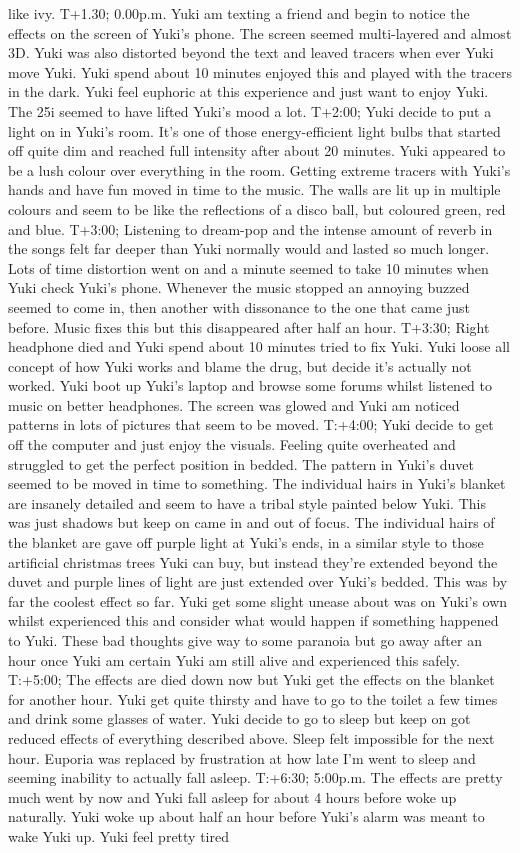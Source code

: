 \documentclass[12pt]{book}
\begin{document}
like ivy. T+1.30; 0.00p.m. Yuki am texting a friend and begin to notice the effects on the screen of Yuki's phone. The screen seemed multi-layered and almost 3D. Yuki was also distorted beyond the text and leaved tracers when ever Yuki move Yuki. Yuki spend about 10 minutes enjoyed this and played with the tracers in the dark. Yuki feel euphoric at this experience and just want to enjoy Yuki. The 25i seemed to have lifted Yuki's mood a lot. T+2:00; Yuki decide to put a light on in Yuki's room. It's one of those energy-efficient light bulbs that started off quite dim and reached full intensity after about 20 minutes. Yuki appeared to be a lush colour over everything in the room. Getting extreme tracers with Yuki's hands and have fun moved in time to the music. The walls are lit up in multiple colours and seem to be like the reflections of a disco ball, but coloured green, red and blue. T+3:00; Listening to dream-pop and the intense amount of reverb in the songs felt far deeper than Yuki normally would and lasted so much longer. Lots of time distortion went on and a minute seemed to take 10 minutes when Yuki check Yuki's phone. Whenever the music stopped an annoying buzzed seemed to come in, then another with dissonance to the one that came just before. Music fixes this but this disappeared after half an hour. T+3:30; Right headphone died and Yuki spend about 10 minutes tried to fix Yuki. Yuki loose all concept of how Yuki works and blame the drug, but decide it's actually not worked. Yuki boot up Yuki's laptop and browse some forums whilst listened to music on better headphones. The screen was glowed and Yuki am noticed patterns in lots of pictures that seem to be moved. T:+4:00; Yuki decide to get off the computer and just enjoy the visuals. Feeling quite overheated and struggled to get the perfect position in bedded. The pattern in Yuki's duvet seemed to be moved in time to something. The individual hairs in Yuki's blanket are insanely detailed and seem to have a tribal style painted below Yuki. This was just shadows but keep on came in and out of focus. The individual hairs of the blanket are gave off purple light at Yuki's ends, in a similar style to those artificial christmas trees Yuki can buy, but instead they're extended beyond the duvet and purple lines of light are just extended over Yuki's bedded. This was by far the coolest effect so far. Yuki get some slight unease about was on Yuki's own whilst experienced this and consider what would happen if something happened to Yuki. These bad thoughts give way to some paranoia but go away after an hour once Yuki am certain Yuki am still alive and experienced this safely. T:+5:00; The effects are died down now but Yuki get the effects on the blanket for another hour. Yuki get quite thirsty and have to go to the toilet a few times and drink some glasses of water. Yuki decide to go to sleep but keep on got reduced effects of everything described above. Sleep felt impossible for the next hour. Euporia was replaced by frustration at how late I'm went to sleep and seeming inability to actually fall asleep. T:+6:30; 5:00p.m. The effects are pretty much went by now and Yuki fall asleep for about 4 hours before woke up naturally. Yuki woke up about half an hour before Yuki's alarm was meant to wake Yuki up. Yuki feel pretty tired 
\end{document}

